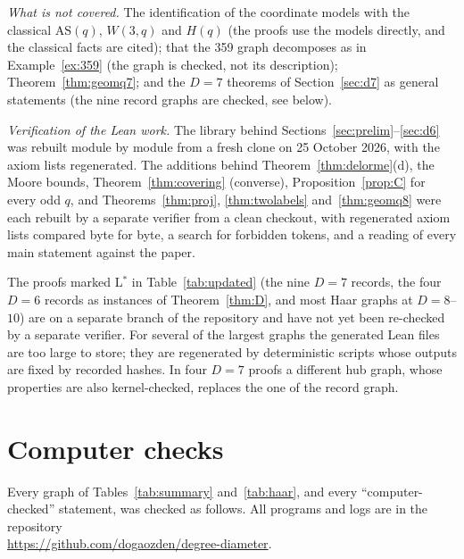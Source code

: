 \documentclass[11pt]{amsart}
\theoremstyle{definition}
\theoremstyle{remark}
\numberwithin{equation}{section}
\newcommand{\AS}{\mathrm{AS}}
\begin{document}
\emph{What is not covered.} The identification of the coordinate models with the classical $\AS(q)$, $W(3,q)$ and $H(q)$
(the proofs use the models directly, and the classical facts are cited); that the 359 graph decomposes as in
Example~\ref{ex:359} (the graph is checked, not its description); Theorem~\ref{thm:geomq7}; and the $D=7$ theorems of
Section~\ref{sec:d7} as general statements (the nine record graphs are checked, see below).

\emph{Verification of the Lean work.} The library behind Sections~\ref{sec:prelim}--\ref{sec:d6} was rebuilt module by module
from a fresh clone on 25 October 2026, with the axiom lists regenerated. The additions behind Theorem~\ref{thm:delorme}(d),
the Moore bounds, Theorem~\ref{thm:covering} (converse), Proposition~\ref{prop:C} for every odd $q$, and
Theorems~\ref{thm:proj}, \ref{thm:twolabels} and~\ref{thm:geomq8} were each rebuilt by a separate verifier from a clean
checkout, with regenerated axiom lists compared byte for byte, a search for forbidden tokens, and a reading of every main
statement against the paper.

The proofs marked \textsf L$^*$ in Table~\ref{tab:updated} (the nine $D=7$ records, the four $D=6$ records as instances of
Theorem~\ref{thm:D}, and most Haar graphs at $D=8$--$10$) are on a separate branch of the repository and have not yet been
re-checked by a separate verifier. For several of the largest graphs the generated Lean files are too large to store; they are
regenerated by deterministic scripts whose outputs are fixed by recorded hashes. In four $D=7$ proofs a different hub graph,
whose properties are also kernel-checked, replaces the one of the record graph.

\section{Computer checks}\label{app:checks}

Every graph of Tables~\ref{tab:summary} and~\ref{tab:haar}, and every ``computer-checked'' statement, was checked as follows.
All programs and logs are in the repository\\ \url{https://github.com/dogaozden/degree-diameter}.
\end{document}
